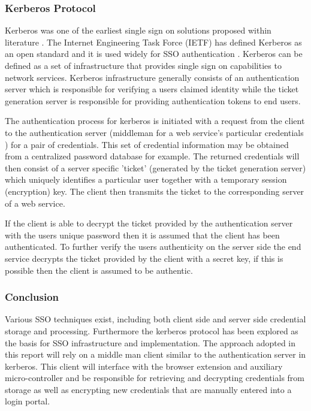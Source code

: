 \subsubsection{Kerberos Protocol }

Kerberos was one of the earliest single sign on solutions proposed within literature \cite{sso3}. The Internet Engineering Task Force (IETF) has defined Kerberos as an open standard and it is used widely for SSO authentication \cite{sso2}. Kerberos can be defined as a set of infrastructure that provides single sign on capabilities to network services. Kerberos infrastructure generally consists of an authentication server which is responsible for verifying a users claimed identity while the ticket generation server is responsible for providing authentication tokens to end users.  \clearpage

The authentication process for kerberos is initiated with a request from the client to the authentication server (middleman for a web service's particular credentials \cite{sso4}) for a pair of credentials. This set of credential information may be obtained from a centralized password database for example. The returned credentials will then consist of a server specific 'ticket' (generated by the ticket generation server) which uniquely identifies a particular user together with a temporary session (encryption) key. The client then transmits the ticket to the corresponding server of a web service. 

If the client is able to decrypt the ticket provided by the authentication server with the users unique password then it is assumed that the client has been authenticated. To further verify the users authenticity on the server side the end service decrypts the ticket provided by the client with a secret key, if this is possible then the client is assumed to be authentic.

\subsubsection{Conclusion}

Various SSO techniques exist, including both client side and server side credential storage and processing. Furthermore the kerberos protocol has been explored as the basis for SSO infrastructure and implementation. The approach adopted in this report will rely on a middle man client similar to the authentication server in kerberos. This client will interface with the browser extension and auxiliary micro-controller and be responsible for retrieving and decrypting credentials from storage as well as encrypting new credentials that are manually entered into a login portal.

